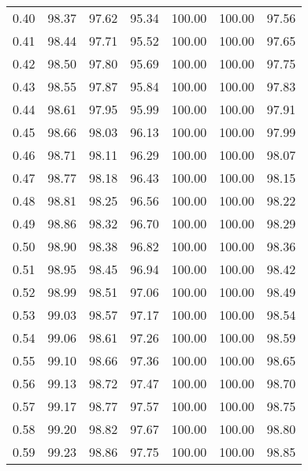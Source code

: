\begin{tabular}{|c|c|c|c|c|c|c|}
      0.40 &     98.37 &     97.62 &      95.34 &  100.00 &     100.00 &         97.56 \\
      0.41 &     98.44 &     97.71 &      95.52 &  100.00 &     100.00 &         97.65 \\
      0.42 &     98.50 &     97.80 &      95.69 &  100.00 &     100.00 &         97.75 \\
      0.43 &     98.55 &     97.87 &      95.84 &  100.00 &     100.00 &         97.83 \\
      0.44 &     98.61 &     97.95 &      95.99 &  100.00 &     100.00 &         97.91 \\
      0.45 &     98.66 &     98.03 &      96.13 &  100.00 &     100.00 &         97.99 \\
      0.46 &     98.71 &     98.11 &      96.29 &  100.00 &     100.00 &         98.07 \\
      0.47 &     98.77 &     98.18 &      96.43 &  100.00 &     100.00 &         98.15 \\
      0.48 &     98.81 &     98.25 &      96.56 &  100.00 &     100.00 &         98.22 \\
      0.49 &     98.86 &     98.32 &      96.70 &  100.00 &     100.00 &         98.29 \\
      0.50 &     98.90 &     98.38 &      96.82 &  100.00 &     100.00 &         98.36 \\
      0.51 &     98.95 &     98.45 &      96.94 &  100.00 &     100.00 &         98.42 \\
      0.52 &     98.99 &     98.51 &      97.06 &  100.00 &     100.00 &         98.49 \\
      0.53 &     99.03 &     98.57 &      97.17 &  100.00 &     100.00 &         98.54 \\
      0.54 &     99.06 &     98.61 &      97.26 &  100.00 &     100.00 &         98.59 \\
      0.55 &     99.10 &     98.66 &      97.36 &  100.00 &     100.00 &         98.65 \\
      0.56 &     99.13 &     98.72 &      97.47 &  100.00 &     100.00 &         98.70 \\
      0.57 &     99.17 &     98.77 &      97.57 &  100.00 &     100.00 &         98.75 \\
      0.58 &     99.20 &     98.82 &      97.67 &  100.00 &     100.00 &         98.80 \\
      0.59 &     99.23 &     98.86 &      97.75 &  100.00 &     100.00 &         98.85 \\

\end{tabular}
